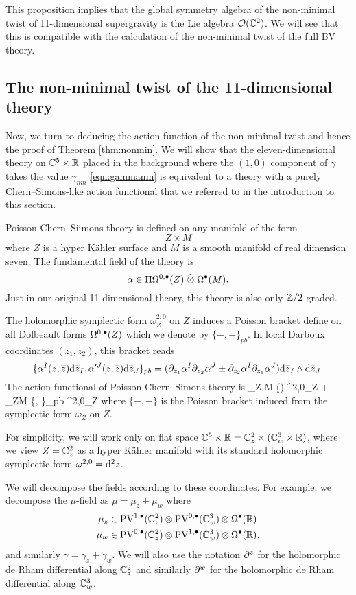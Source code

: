 This proposition implies that the global symmetry algebra of the non-minimal twist of 11-dimensional supergravity is the Lie algebra $\mathcal O(\mathbb C^2)$. 
We will see that this is compatible with the calculation of the non-minimal twist of the full BV theory. 

\subsection{The non-minimal twist of the 11-dimensional theory}

Now, we turn to deducing the action function of the non-minimal twist and hence the proof of Theorem \ref{thm:nonmin}. 
We will show that the eleven-dimensional theory on $\mathbb C^5 \times \mathbb R$ placed in the background where the $(1,0)$ component of $\gamma$ takes the value $\gamma_{nm}$ \eqref{eqn:gammanm} is equivalent to a theory with a purely Chern--Simons-like action functional that we referred to in the introduction to this section. 

Poisson Chern--Siimons theory is defined on any manifold of the form
\[
Z \times M
\]
where $Z$ is a hyper K\"ahler surface and $M$ is a smooth manifold of real dimension seven. 
The fundamental field of the theory is  
\[
\alpha \in \Pi \Omega^{0,\bullet}(Z) \; \widehat{\otimes} \; \Omega^\bullet(M)  .
\]
Just in our original 11-dimensional theory, this theory is also only $\mathbb Z/2$ graded. 

The holomorphic symplectic form $\omega_Z^{2,0}$ on $Z$ induces a Poisson bracket define on all Dolbeault forms $\Omega^{0,\bullet}(Z)$ which we denote by $\{-,-\}_{pb}$. 
In local Darboux coordinates $(z_1,z_2)$, this bracket reads
\[
\{\alpha^I (z,\overline{z}) {\rm d} \overline{z}_I , \alpha'^J (z,\overline{z}) {\rm d} \overline{z}_J\}_{pb} = (\partial_{z_1} \alpha^I \partial_{z_2} \alpha^J \pm \partial_{z_2} \alpha^I \partial_{z_1} \alpha^J) {\rm d} \overline{z}_I \wedge {\rm d} \overline{z}_J . 
\]
The action functional of Poisson Chern--Simons theory is 
\beqn\label{eqn:pcsaction}
     \int_{Z \times M} (\alpha \wedge \d\alpha) \wedge \omega^{2,0}_Z  +  \int_{Z\times M} \alpha \wedge \{\alpha, \alpha\}_{pb} \wedge \omega^{2,0}_Z
\eeqn
where $\{-,-\}$ is the Poisson bracket induced from the symplectic form $\omega_Z$ on $Z$. 

For simplicity, we will work only on flat space $\mathbb C^5 \times \mathbb R = \mathbb C^2_z \times (\mathbb C^3_w \times \mathbb R)$, where we view $Z = \mathbb C^2_z$ as a hyper K\"ahler manifold with its standard holomorphic symplectic form $\omega^{2,0} = {\rm d}^2 z$.

We will decompose the fields according to these coordinates. 
For example, we decompose the $\mu$-field as $\mu = \mu_z + \mu_w$ where
\begin{align*}
\mu_z  &\in {\rm PV}^{1,\bullet}(\mathbb C^2_z) \otimes {\rm PV}^{0,\bullet}(\mathbb C^3_w) \otimes \Omega^\bullet(\mathbb R) \\
\mu_w & \in {\rm PV}^{0,\bullet}(\mathbb C^2_z) \otimes {\rm PV}^{1,\bullet}(\mathbb C^3_w) \otimes \Omega^\bullet(\mathbb R)  .
\end{align*}
and similarly $\gamma = \gamma_z + \gamma_w$. 
We will also use the notation $\partial^z$ for the holomorphic de Rham differential along $\mathbb C_z^2$ and similarly $\partial^w$ for the holomorphic de Rham differential along $\mathbb C^3_w$. 


